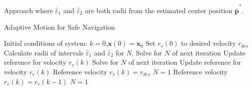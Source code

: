 \begin{section}{Approach}
where $\hat{\varepsilon}_1$ and $\hat{\varepsilon}_2$ are both radii from the estimated center position $\hat{\bar{\bm{p}}}^*$.
	


\begin{algorithm}
   \caption{Adaptive Motion for Safe Navigation} 
   \label{alg:adapt_motion} 
    \begin{algorithmic}[1]
	\State Initial conditions of system: $k=0$,$\bm{x}(0)=\bm{x}_0$
	\State Set $r_v(0)$ to desired velocity $r_{des}$
        \State {}
        \State Calculate radii of intervals $\hat{\varepsilon}_1$ and $\hat{\varepsilon}_2$ for $N$.
            \State Solve for $N$ of next iteration
            \State Update reference for velocity $r_v(k)$
        \Else
                \State Solve for $N$ of next iteration
                \State Update reference for velocity $r_v(k)$
            \Else
                    \State Reference velocity $r_v(k)=r_{des}$
                    \State $N = 1$
                \Else
                    \State Reference velocity $r_v(k) = r_v(k-1)$
                    \State $N = 1$
                \EndIf
            \EndIf
        \EndIf
    \EndWhile
	\end{algorithmic}
\end{algorithm}



\end{section} 